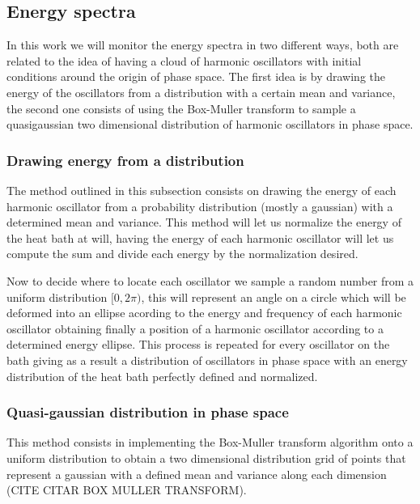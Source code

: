 \subsection{Energy spectra}
In this work we will monitor the energy spectra in two different ways, both are related to the idea of having a cloud of harmonic oscillators with initial conditions around the origin of phase space. The first idea is by  drawing the energy of the oscillators from a distribution with a certain mean and variance, the second one consists of using the Box-Muller transform to sample a quasigaussian two dimensional distribution of harmonic oscillators in phase space. 
\subsubsection{Drawing energy from a distribution}
The method outlined in this subsection consists on drawing the energy of each harmonic oscillator from a probability distribution (mostly a gaussian) with a determined mean and variance. This method will let us normalize the energy of the heat bath at will, having the energy of each harmonic oscillator will let us compute the sum and divide each energy by the normalization desired.\par 
Now to decide where to locate each oscillator we sample a random number from a uniform distribution $[0,2\pi)$, this will represent an angle on a circle which will be deformed into an ellipse acording to the energy and frequency of each harmonic oscillator obtaining finally a position of a harmonic oscillator according to a determined energy ellipse. This process is repeated for every oscillator on the bath giving as a result a distribution of oscillators in phase space with an energy distribution of the heat bath perfectly defined and normalized.

\subsubsection{Quasi-gaussian distribution in phase space}
This method consists in implementing the Box-Muller transform algorithm onto a uniform distribution to obtain a two dimensional distribution grid of points that represent a gaussian with a defined mean and variance along each dimension (CITE CITAR BOX MULLER TRANSFORM).





